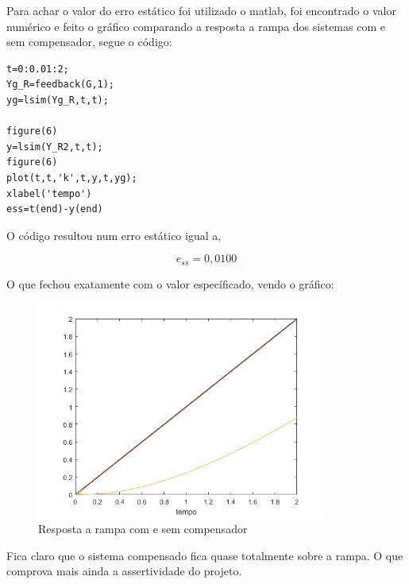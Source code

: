 Para achar o valor do erro estático foi utilizado o matlab, foi encontrado o valor numérico e feito o gráfico comparando a resposta a rampa dos sistemas com e sem compensador, segue o código:

\begin{lstlisting}[style=matlab]
t=0:0.01:2;
Yg_R=feedback(G,1);
yg=lsim(Yg_R,t,t);

figure(6)
y=lsim(Y_R2,t,t);
figure(6)
plot(t,t,'k',t,y,t,yg);
xlabel('tempo')
ess=t(end)-y(end)
\end{lstlisting}\vspace{0.2cm}

O código resultou num erro estático igual a,

{\color{red} \[\boxed{e_{ss} = 0,0100}\]}

O que fechou exatamente com o valor específicado, vendo o gráfico:

\begin{figure}[H]
  \centering
  \includegraphics[width=0.85\textwidth]{images/fig7.png}
  \caption{Resposta a rampa com e sem compensador}
\end{figure}

Fica claro que o sistema compensado fica quase totalmente sobre a rampa. O que comprova mais ainda a assertividade do projeto. \newpage































